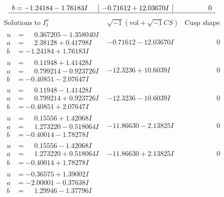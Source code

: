\documentclass[1p]{elsarticle_modified}
\theoremstyle{definition}
\newcommand{\I}{\sqrt{-1}}
\begin{document}
$$\begin{array}{c|c|c}
\begin{aligned}
b &= -1.24184 - 1.76183 I\end{aligned}
 & -0.71612 + 12.03670 I & \phantom{-0.000000 } 0\\
 \hline 
 \end{array}$$\newpage$$\begin{array}{c|c|c}  
\text{Solutions to }I^u_{1}& \I (\text{vol} + \sqrt{-1}CS) & \text{Cusp shape}\\
 \hline 
\begin{aligned}
u &= \phantom{-}0.367205 - 1.358040 I \\
a &= \phantom{-}2.38128 + 0.41798 I \\
b &= -1.24184 + 1.76183 I\end{aligned}
 & -0.71612 - 12.03670 I & \phantom{-0.000000 } 0 \\ \hline\begin{aligned}
u &= \phantom{-}0.11948 + 1.41428 I \\
a &= \phantom{-}0.799214 - 0.923726 I \\
b &= -0.40851 - 2.07647 I\end{aligned}
 & -12.3236 + 10.6039 I & \phantom{-0.000000 } 0 \\ \hline\begin{aligned}
u &= \phantom{-}0.11948 - 1.41428 I \\
a &= \phantom{-}0.799214 + 0.923726 I \\
b &= -0.40851 + 2.07647 I\end{aligned}
 & -12.3236 - 10.6039 I & \phantom{-0.000000 } 0 \\ \hline\begin{aligned}
u &= \phantom{-}0.15556 + 1.42068 I \\
a &= \phantom{-}1.273220 - 0.518064 I \\
b &= -0.40014 - 1.78278 I\end{aligned}
 & -11.86630 - 2.13825 I & \phantom{-0.000000 } 0 \\ \hline\begin{aligned}
u &= \phantom{-}0.15556 - 1.42068 I \\
a &= \phantom{-}1.273220 + 0.518064 I \\
b &= -0.40014 + 1.78278 I\end{aligned}
 & -11.86630 + 2.13825 I & \phantom{-0.000000 } 0 \\ \hline\begin{aligned}
u &= -0.36575 + 1.39002 I \\
a &= -2.00001 - 0.37638 I \\
b &= \phantom{-}1.29946 - 1.37796 I\end{aligned}

\end{array}$$
\end{document}
